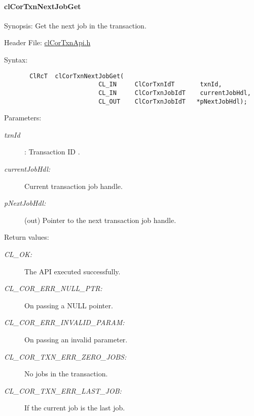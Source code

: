 \hypertarget{pagecor514}{}\paragraph{cl\-Cor\-Txn\-Next\-Job\-Get}\label{pagecor514}
\begin{Desc}
\item[Synopsis:]Get the next job in the transaction.\end{Desc}
\begin{Desc}
\item[Header File:]\hyperlink{cl_cor_txn_api_8h}{cl\-Cor\-Txn\-Api.h}\end{Desc}
\begin{Desc}
\item[Syntax:]

\footnotesize\begin{verbatim}       ClRcT  clCorTxnNextJobGet(
                          CL_IN     ClCorTxnIdT       txnId,
                          CL_IN     ClCorTxnJobIdT    currentJobHdl,
                          CL_OUT    ClCorTxnJobIdT   *pNextJobHdl);
\end{verbatim}
\normalsize
\end{Desc}
\begin{Desc}
\item[Parameters:]
\begin{description}
\item[{\em txn\-Id}]: Transaction ID . \item[{\em current\-Job\-Hdl:}]Current transaction job handle. \item[{\em p\-Next\-Job\-Hdl:}](out) Pointer to the next transaction job handle.\end{description}
\end{Desc}
\begin{Desc}
\item[Return values:]
\begin{description}
\item[{\em CL\_\-OK:}]The API executed successfully. \item[{\em CL\_\-COR\_\-ERR\_\-NULL\_\-PTR:}]On passing a NULL pointer. \item[{\em CL\_\-COR\_\-ERR\_\-INVALID\_\-PARAM:}]On passing an invalid parameter. \item[{\em CL\_\-COR\_\-TXN\_\-ERR\_\-ZERO\_\-JOBS:}]No jobs in the transaction. \item[{\em CL\_\-COR\_\-TXN\_\-ERR\_\-LAST\_\-JOB:}]If the current job is the last job.\end{description}
\end{Desc}
